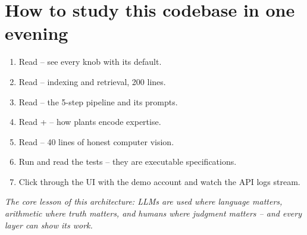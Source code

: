 \section*{How to study this codebase in one evening}
\begin{enumerate}[nosep]
  \item Read  -- see every knob with its default.
  \item Read  -- indexing and retrieval, 200 lines.
  \item Read  -- the 5-step pipeline and its prompts.
  \item Read  + 
        -- how plants encode expertise.
  \item Read  -- 40 lines of honest
        computer vision.
  \item Run  and read the tests -- they are executable specifications.
  \item Click through the UI with the demo account and watch the API logs stream.
\end{enumerate}

\noindent\emph{The core lesson of this architecture: LLMs are used where language
matters, arithmetic where truth matters, and humans where judgment matters -- and
every layer can show its work.}
